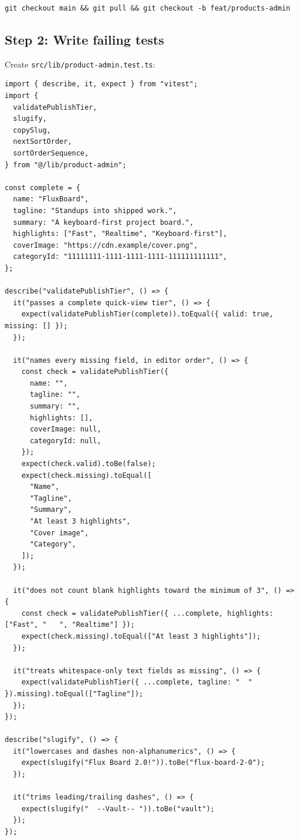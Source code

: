 \documentclass[11pt,a4paper]{article}
\begin{document}
\begin{lstlisting}
git checkout main && git pull && git checkout -b feat/products-admin
\end{lstlisting}

\subsection*{Step 2: Write failing tests}

Create \texttt{src/lib/product-admin.test.ts}:

\begin{lstlisting}
import { describe, it, expect } from "vitest";
import {
  validatePublishTier,
  slugify,
  copySlug,
  nextSortOrder,
  sortOrderSequence,
} from "@/lib/product-admin";

const complete = {
  name: "FluxBoard",
  tagline: "Standups into shipped work.",
  summary: "A keyboard-first project board.",
  highlights: ["Fast", "Realtime", "Keyboard-first"],
  coverImage: "https://cdn.example/cover.png",
  categoryId: "11111111-1111-1111-1111-111111111111",
};

describe("validatePublishTier", () => {
  it("passes a complete quick-view tier", () => {
    expect(validatePublishTier(complete)).toEqual({ valid: true, missing: [] });
  });

  it("names every missing field, in editor order", () => {
    const check = validatePublishTier({
      name: "",
      tagline: "",
      summary: "",
      highlights: [],
      coverImage: null,
      categoryId: null,
    });
    expect(check.valid).toBe(false);
    expect(check.missing).toEqual([
      "Name",
      "Tagline",
      "Summary",
      "At least 3 highlights",
      "Cover image",
      "Category",
    ]);
  });

  it("does not count blank highlights toward the minimum of 3", () => {
    const check = validatePublishTier({ ...complete, highlights: ["Fast", "   ", "Realtime"] });
    expect(check.missing).toEqual(["At least 3 highlights"]);
  });

  it("treats whitespace-only text fields as missing", () => {
    expect(validatePublishTier({ ...complete, tagline: "  " }).missing).toEqual(["Tagline"]);
  });
});

describe("slugify", () => {
  it("lowercases and dashes non-alphanumerics", () => {
    expect(slugify("Flux Board 2.0!")).toBe("flux-board-2-0");
  });

  it("trims leading/trailing dashes", () => {
    expect(slugify("  --Vault-- ")).toBe("vault");
  });
});


\end{lstlisting}
\end{document}
